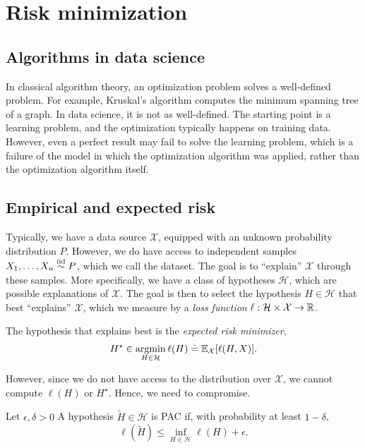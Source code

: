 \section{Risk minimization}

\subsection{Algorithms in data science}

In classical algorithm theory, an optimization problem solves a well-defined problem. For example,
Kruskal's algorithm computes the minimum spanning tree of a graph. In data science, it is not as
well-defined. The starting point is a learning problem, and the optimization typically happens on
training data. However, even a perfect result may fail to solve the learning problem, which is a
failure of the model in which the optimization algorithm was applied, rather than the optimization
algorithm itself.

\subsection{Empirical and expected risk}

Typically, we have a data source $\mathcal{X}$, equipped with an unknown probability distribution
$P$. However, we do have access to independent samples $X_1,\ldots,X_n \overset{\mathrm{iid}}{\sim} P$, which we call
the dataset. The goal is to ``explain'' $\mathcal{X}$ through these samples. More specifically, we
have a class of hypotheses $\mathcal{H}$, which are possible explanations of $\mathcal{X}$. The
goal is then to select the hypothesis $H\in \mathcal{H}$ that best ``explains'' $\mathcal{X}$,
which we measure by a \textit{loss function} $\ell: \mathcal{H}\times \mathcal{X}\to \mathbb{R}$.

The hypothesis that explains best is the \textit{expected risk minimizer}, \[
    H^\star \in \operatorname*{argmin}_{H\in \mathcal{H}} \ell(H) \doteq \mathbb{E}_{\mathcal{X}}[\ell(H, X)].
\]

However, since we do not have access to the distribution over $\mathcal{X}$, we cannot compute
$\ell(H)$ or $H^\star$. Hence, we need to compromise.

\begin{definition}
    Let $\epsilon, \delta > 0$ A hypothesis $\tilde{H} \in \mathcal{H}$ is PAC if, with probability at least $1-\delta$, \[
        \ell(\tilde{H}) \leq \inf_{H \in \mathcal{H}} \ell(H) + \epsilon.
    \]
\end{definition}

